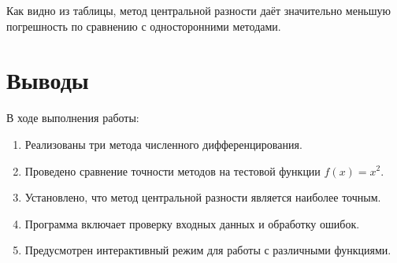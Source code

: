 \documentclass[12pt,a4paper]{article}
\begin{document}
Как видно из таблицы, метод центральной разности даёт значительно меньшую погрешность по сравнению с односторонними методами.

\section{Выводы}

В ходе выполнения работы:

\begin{enumerate}
    \item Реализованы три метода численного дифференцирования.
    \item Проведено сравнение точности методов на тестовой функции $f(x) = x^2$.
    \item Установлено, что метод центральной разности является наиболее точным.
    \item Программа включает проверку входных данных и обработку ошибок.
    \item Предусмотрен интерактивный режим для работы с различными функциями.
\end{enumerate}
\end{document}
